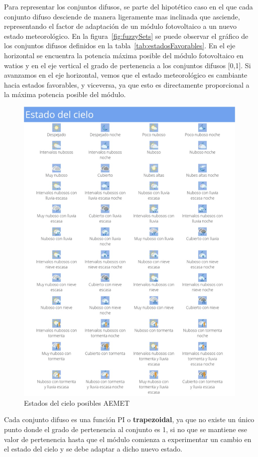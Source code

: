 Para representar los conjuntos difusos, se parte del hipotético caso en el que cada conjunto difuso desciende de manera ligeramente mas inclinada que asciende, representando el factor de adaptación de un módulo fotovoltaico a un nuevo estado meteorológico. En la figura~\ref{fig:fuzzySets} se puede observar el gráfico de los conjuntos difusos definidos en la tabla~\ref{tab:estadosFavorables}. En el eje horizontal se encuentra la potencia máxima posible del módulo fotovoltaico en watios y en el eje vertical el grado de pertenencia a los conjuntos difusos [0,1]. Si avanzamos en el eje horizontal, vemos que el estado meteorológico es cambiante hacia estados favorables, y viceversa, ya que esto es directamente proporcional a la máxima potencia posible del módulo.
\begin{figure}[H]
	\centering
	\includegraphics[width=17cm]{figs/estadoCieloAEMET.png}
	\caption{Estados del cielo posibles AEMET}
	\label{fig:estadoCielo}
\end{figure}
Cada conjunto difuso es una función PI o \textbf{trapezoidal}, ya que no existe un único punto donde el grado de pertenencia al conjunto es 1, si no que se mantiene ese valor de pertenencia hasta que el módulo comienza a experimentar un cambio en el estado del cielo y se debe adaptar a dicho nuevo estado.

